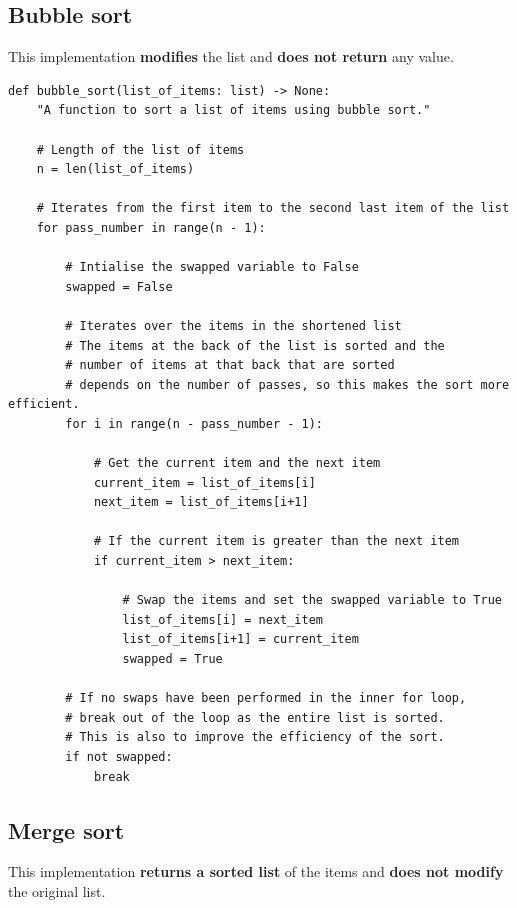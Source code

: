 \documentclass[11pt]{article}
\begin{document}
\subsection{Bubble sort}
\label{sec:org8c6890d}
This implementation \textbf{modifies} the list and \textbf{does not return} any value.
\begin{verbatim}
def bubble_sort(list_of_items: list) -> None:
    "A function to sort a list of items using bubble sort."

    # Length of the list of items
    n = len(list_of_items)

    # Iterates from the first item to the second last item of the list
    for pass_number in range(n - 1):

        # Intialise the swapped variable to False
        swapped = False

        # Iterates over the items in the shortened list
        # The items at the back of the list is sorted and the
        # number of items at that back that are sorted
        # depends on the number of passes, so this makes the sort more efficient.
        for i in range(n - pass_number - 1):

            # Get the current item and the next item
            current_item = list_of_items[i]
            next_item = list_of_items[i+1]

            # If the current item is greater than the next item
            if current_item > next_item:

                # Swap the items and set the swapped variable to True
                list_of_items[i] = next_item
                list_of_items[i+1] = current_item
                swapped = True

        # If no swaps have been performed in the inner for loop,
        # break out of the loop as the entire list is sorted.
        # This is also to improve the efficiency of the sort.
        if not swapped:
            break
\end{verbatim}

\subsection{Merge sort}
\label{sec:org763d1c8}
This implementation \textbf{returns a sorted list} of the items and \textbf{does not modify} the original list.
\end{document}
